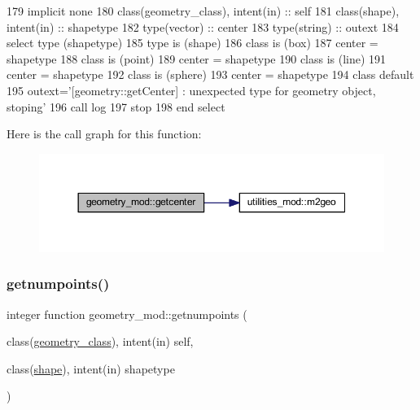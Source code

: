 \begin{DoxyCode}
179     \textcolor{keywordtype}{implicit none}
180     \textcolor{keywordtype}{class}(geometry\_class), \textcolor{keywordtype}{intent(in)} :: self
181     \textcolor{keywordtype}{class}(shape), \textcolor{keywordtype}{intent(in)} :: shapetype
182     \textcolor{keywordtype}{type}(vector) :: center
183     \textcolor{keywordtype}{type}(string) :: outext
184     \textcolor{keywordflow}{select type} (shapetype)
185 \textcolor{keywordflow}{    type is} (shape)
186 \textcolor{keywordflow}{    class is} (box)
187         center = shapetype%
188 \textcolor{keywordflow}{    class is} (point)
189         center = shapetype%
190 \textcolor{keywordflow}{    class is} (line)
191         center = shapetype%
192 \textcolor{keywordflow}{    class is} (sphere)
193         center = shapetype%
194 \textcolor{keywordflow}{        class default}
195         outext=\textcolor{stringliteral}{'[geometry::getCenter] : unexpected type for geometry object, stoping'}
196         \textcolor{keyword}{call }log%
197         stop
198 \textcolor{keywordflow}{    end select}
\end{DoxyCode}
Here is the call graph for this function\+:\nopagebreak
\begin{figure}[H]
\begin{center}
\leavevmode
\includegraphics[width=350pt]{namespacegeometry__mod_a4a38edbff02aa0ff5f16a16c39bf778e_cgraph}
\end{center}
\end{figure}
\mbox{\label{namespacegeometry__mod_a524c5d28a80fb6729b102126485605ce}} 
\subsubsection{\texorpdfstring{getnumpoints()}{getnumpoints()}}
{\footnotesize\ttfamily integer function geometry\+\_\+mod\+::getnumpoints (\begin{DoxyParamCaption}\item[{class(\mbox{\hyperlink{structgeometry__mod_1_1geometry__class}{geometry\+\_\+class}}), intent(in)}]{self,  }\item[{class(\mbox{\hyperlink{structgeometry__mod_1_1shape}{shape}}), intent(in)}]{shapetype }\end{DoxyParamCaption})\hspace{0.3cm}{\ttfamily [private]}}



